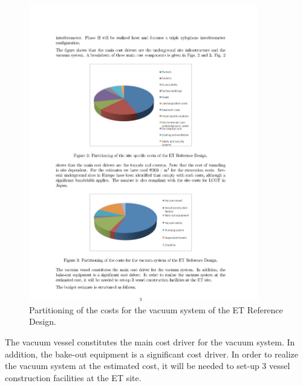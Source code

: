\begin{figure}[htbp!]
	\begin{center}
		\includegraphics[width=10cm]{./Sec_SiteInfra/Figures/ETcost3.pdf}
		\caption{Partitioning of the costs for the vacuum system of the ET Reference Design.}
		\label{fig:etcost3}
	\end{center}
\end{figure}
The vacuum vessel constitutes the main cost driver for the vacuum system.
In addition, the bake-out equipment is a significant cost driver. In order to
realize the vacuum system at the estimated cost, it will be needed to set-up
3 vessel construction facilities at the ET site. 

